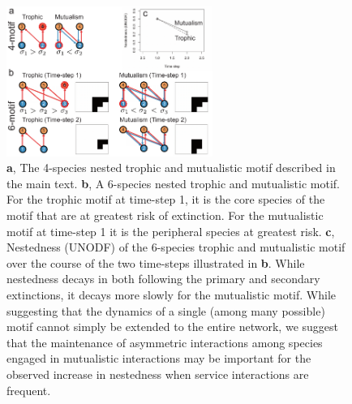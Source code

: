 \documentclass[twocolumn,preprintnumbers,amsmath,amssymb,superscriptaddress,linenumbers]{revtex4-1}
\begin{document}


\begin{figure}[h!]
\centering
\includegraphics[width=0.6\textwidth]{fig_motif.pdf}
\caption{
\textbf{a}, The 4-species nested trophic and mutualistic motif described in the main text.
\textbf{b}, A 6-species nested trophic and mutualistic motif. For the trophic motif at time-step 1, it is the core species of the motif that are at greatest risk of extinction. For the mutualistic motif at time-step 1 it is the peripheral species at greatest risk.
\textbf{c}, Nestedness (UNODF) of the 6-species trophic and mutualistic motif over the course of the two time-steps illustrated in \textbf{b}. While nestedness decays in both following the primary and secondary extinctions, it decays more slowly for the mutualistic motif.
While suggesting that the dynamics of a single (among many possible) motif cannot simply be extended to the entire network, we suggest that the maintenance of asymmetric interactions among species engaged in mutualistic interactions may be important for the observed increase in nestedness when service interactions are frequent.
}
\label{fig:motif}
\end{figure}
\end{document}
